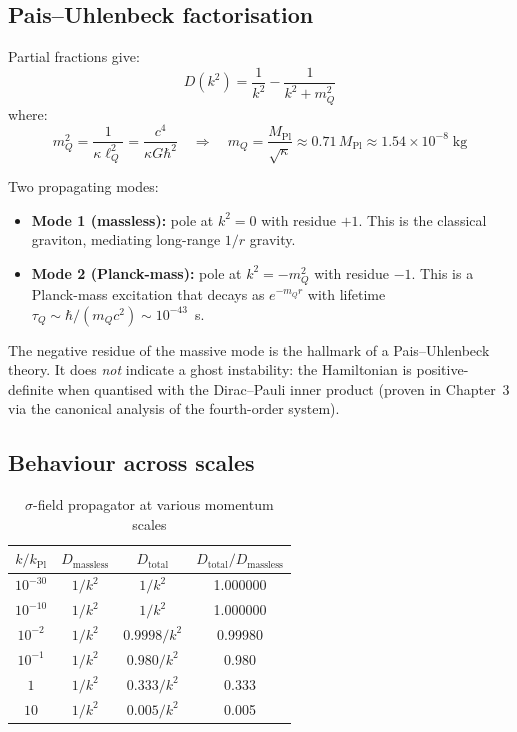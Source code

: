 \documentclass[11pt,a4paper]{article}
\theoremstyle{plain}
\theoremstyle{definition}
\theoremstyle{remark}
\newcommand{\lQ}{\ell_Q}
\newcommand{\mQ}{m_Q}
\newcommand{\Mpl}{M_{\mathrm{Pl}}}
\begin{document}
\subsection{Pais--Uhlenbeck factorisation}

Partial fractions give:
\begin{equation}
  \boxed{D(k^2) = \frac{1}{k^2} - \frac{1}{k^2 + \mQ^2}}
  \label{eq:propagator_PU}
\end{equation}
where:
\begin{equation}
  \mQ^2 = \frac{1}{\kappa\lQ^2} = \frac{c^4}{\kappa G\hbar^2} \quad\Longrightarrow\quad \mQ = \frac{\Mpl}{\sqrt\kappa} \approx 0.71\,\Mpl \approx 1.54\times10^{-8}\;\mathrm{kg}
\end{equation}

Two propagating modes:
\begin{itemize}
  \item \textbf{Mode 1 (massless):} pole at $k^2 = 0$ with residue $+1$.  This is the classical graviton, mediating long-range $1/r$ gravity.
  \item \textbf{Mode 2 (Planck-mass):} pole at $k^2 = -\mQ^2$ with residue $-1$.  This is a Planck-mass excitation that decays as $e^{-\mQ r}$ with lifetime $\tau_Q \sim \hbar/(\mQ c^2) \sim 10^{-43}$~s.
\end{itemize}

The negative residue of the massive mode is the hallmark of a Pais--Uhlenbeck theory.  It does \emph{not} indicate a ghost instability: the Hamiltonian is positive-definite when quantised with the Dirac--Pauli inner product (proven in Chapter~3 via the canonical analysis of the fourth-order system).

\subsection{Behaviour across scales}

\begin{table}[h]
  \centering
  \caption{$\sigma$-field propagator at various momentum scales}
  \renewcommand{\arraystretch}{1.3}
  \begin{tabular}{@{}cccc@{}}
    \toprule
    $k/k_{\mathrm{Pl}}$ & $D_{\mathrm{massless}}$ & $D_{\mathrm{total}}$ & $D_{\mathrm{total}}/D_{\mathrm{massless}}$ \\
    \midrule
    $10^{-30}$ & $1/k^2$ & $1/k^2$ & 1.000000 \\
    $10^{-10}$ & $1/k^2$ & $1/k^2$ & 1.000000 \\
    $10^{-2}$ & $1/k^2$ & $0.9998/k^2$ & 0.99980 \\
    $10^{-1}$ & $1/k^2$ & $0.980/k^2$ & 0.980 \\
    $1$ & $1/k^2$ & $0.333/k^2$ & 0.333 \\
    $10$ & $1/k^2$ & $0.005/k^2$ & 0.005 \\
    \bottomrule
  \end{tabular}
\end{table}
\end{document}
